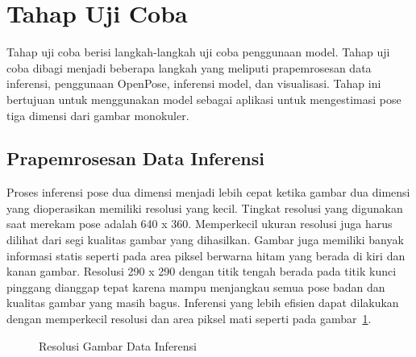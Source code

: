 \section{Tahap Uji Coba} \label{sec:3-TahapUjiCoba}

Tahap uji coba berisi langkah-langkah uji coba penggunaan model.
Tahap uji coba dibagi menjadi beberapa langkah yang meliputi prapemrosesan data inferensi,
penggunaan OpenPose, inferensi model, dan visualisasi. Tahap ini bertujuan untuk menggunakan model
sebagai aplikasi untuk mengestimasi pose tiga dimensi dari gambar monokuler.

\subsection{Prapemrosesan Data Inferensi}

Proses inferensi pose dua dimensi menjadi lebih cepat ketika gambar dua dimensi yang dioperasikan
memiliki resolusi yang kecil. Tingkat resolusi yang digunakan saat merekam pose adalah 640 x 360.
Memperkecil ukuran resolusi juga harus dilihat dari segi kualitas gambar yang dihasilkan.
Gambar juga memiliki banyak informasi statis seperti pada area piksel berwarna hitam yang berada
di kiri dan kanan gambar. Resolusi 290 x 290 dengan titik tengah berada pada titik kunci pinggang dianggap tepat
karena mampu menjangkau semua pose badan dan kualitas gambar yang masih bagus.
Inferensi yang lebih efisien dapat dilakukan dengan memperkecil resolusi
dan area piksel mati seperti pada gambar~\ref{fig:prainferensi}.

\begin{figure}[htbp]
    \begin{center}
    \end{center}
    \vspace{-20pt}
    \captionsetup{labelfont=bf, textfont=bf}
    \caption{Resolusi Gambar Data Inferensi}
    \vspace{-10pt}
    \captionsetup{labelfont=md, textfont=md}
    \label{fig:prainferensi}
\end{figure}

